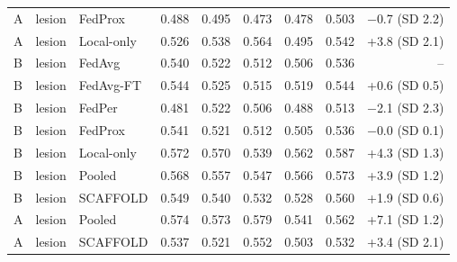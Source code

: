 \documentclass[10pt]{article}
\begin{document}
\begin{table}[!htbp]
\begin{tabular}{@{}lllrrrrrr@{}}
A & lesion & FedProx & 0.488 & 0.495 & 0.473 & 0.478 & 0.503 & $-$0.7 (SD 2.2) \\
A & lesion & Local-only & 0.526 & 0.538 & 0.564 & 0.495 & 0.542 & +3.8 (SD 2.1) \\
B & lesion & FedAvg & 0.540 & 0.522 & 0.512 & 0.506 & 0.536 & -- \\
B & lesion & FedAvg-FT & 0.544 & 0.525 & 0.515 & 0.519 & 0.544 & +0.6 (SD 0.5) \\
B & lesion & FedPer & 0.481 & 0.522 & 0.506 & 0.488 & 0.513 & $-$2.1 (SD 2.3) \\
B & lesion & FedProx & 0.541 & 0.521 & 0.512 & 0.505 & 0.536 & $-$0.0 (SD 0.1) \\
B & lesion & Local-only & 0.572 & 0.570 & 0.539 & 0.562 & 0.587 & +4.3 (SD 1.3) \\
B & lesion & Pooled & 0.568 & 0.557 & 0.547 & 0.566 & 0.573 & +3.9 (SD 1.2) \\
B & lesion & SCAFFOLD & 0.549 & 0.540 & 0.532 & 0.528 & 0.560 & +1.9 (SD 0.6) \\
A & lesion & Pooled & 0.574 & 0.573 & 0.579 & 0.541 & 0.562 & +7.1 (SD 1.2) \\
A & lesion & SCAFFOLD & 0.537 & 0.521 & 0.552 & 0.503 & 0.532 & +3.4 (SD 2.1) \\
\bottomrule
\end{tabular}
\end{table}
\end{document}
